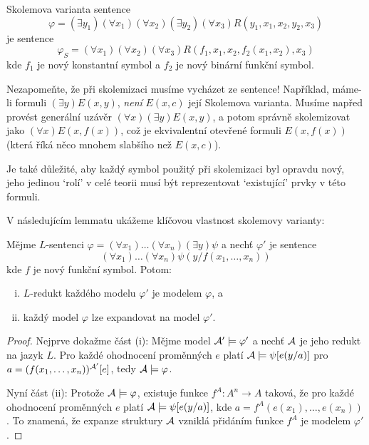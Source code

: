 \begin{example}
    Skolemova varianta sentence 
    $$\varphi=(\exists y_1)(\forall x_1)(\forall x_2)(\exists y_2)(\forall x_3)R(y_1,x_1,x_2,y_2,x_3)$$
    je sentence
    $$
    \varphi_S=(\forall x_1)(\forall x_2)(\forall x_3)R(f_1,x_1,x_2,f_2(x_1,x_2),x_3)
    $$
    kde $f_1$ je nový konstantní symbol a $f_2$ je nový binární funkční symbol.
\end{example}

\begin{remark}
    Nezapomeňte, že při skolemizaci musíme vycházet ze sentence! Například, máme-li formuli $(\exists y)E(x,y)$, \emph{není} $E(x,c)$ její Skolemova varianta. Musíme napřed provést generální uzávěr $(\forall x)(\exists y)E(x,y)$, a potom správně skolemizovat jako $(\forall x)E(x,f(x))$, což je ekvivalentní otevřené formuli $E(x,f(x))$ (která říká něco mnohem slabšího než $E(x,c)$).

    Je také důležité, aby každý symbol použitý při skolemizaci byl opravdu nový, jeho jedinou `rolí' v celé teorii musí být reprezentovat `existující' prvky v této formuli.
\end{remark} 

V následujícím lemmatu ukážeme klíčovou vlastnost skolemovy varianty:

\begin{lemma}\label{lemma:skolem-variant-conservative-extension}
Mějme $L$-sentenci $\varphi=(\forall x_1)\dots(\forall x_n)(\exists y)\psi$ a nechť $\varphi'$ je sentence 
$$
(\forall x_1)\dots(\forall x_n)\psi(y/f(x_1,\dots,x_n))$$
kde $f$ je nový funkční symbol. Potom:
\begin{enumerate}[(i)]
    \item $L$-redukt každého modelu $\varphi'$ je modelem $\varphi$, a 
    \item každý model $\varphi$ lze expandovat na model $\varphi'$.
\end{enumerate}
\end{lemma}

\begin{proof}
    Nejprve dokažme část (i): Mějme model $\mathcal{A}'\models\varphi'$ a nechť $\mathcal{A}$ je jeho redukt na jazyk $L$. Pro každé ohodnocení proměnných $e$ platí $\mathcal{A}\models\psi[e(y/a)]$ pro $a=(f(x_1,\dots,x_n))^{\mathcal{A}'}[e]$, tedy $\mathcal{A}\models\varphi$.
    
    Nyní část (ii): Protože $\mathcal{A}\models\varphi$, existuje funkce $f^A:A^n\to A$ taková, že pro každé ohodnocení proměnných $e$ platí $\mathcal{A}\models \psi[e(y/a)]$, kde $a=f^A(e(x_1),\dots,e(x_n))$. To znamená, že expanze struktury $\mathcal{A}$ vzniklá přidáním funkce $f^A$ je modelem $\varphi'$.    
\end{proof}


